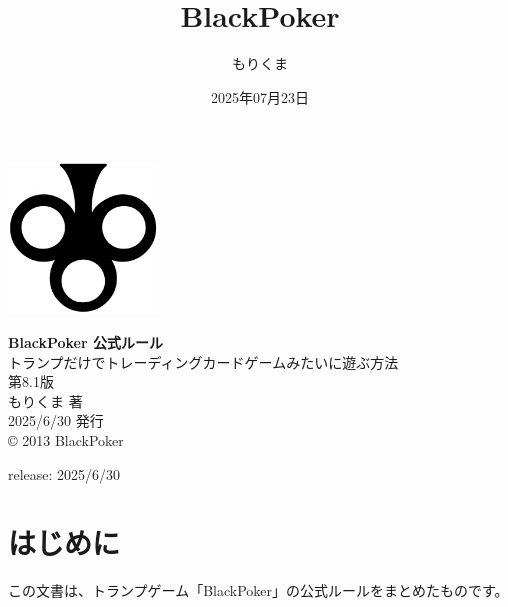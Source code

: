 \documentclass[letterpaper,10pt,dvipdfmx]{sphinxmanual}
\title{BlackPoker}
\date{2025年07月23日}
\author{もりくま}
\begin{document}
\pagestyle{empty}

\begin{titlepage}
\begin{center}
\vspace*{25mm}

\includegraphics[width=4cm]{blackpoker_logo.pdf}  %

\vspace{20mm}
{\Huge \textbf{BlackPoker 公式ルール}}\\[10mm]
{\Large トランプだけでトレーディングカードゲームみたいに遊ぶ方法}\\[30mm]

{\huge 第8.1版}\\[20mm]

{\Large もりくま 著} \\[5mm]
{\Large 2025/6/30 発行}\\[10mm]

{\small © 2013 BlackPoker}

\end{center}
\end{titlepage}

\clearpage
\thispagestyle{empty}  %
\null                  %
\clearpage             %

\pagestyle{plain}
\sphinxtableofcontents
\pagestyle{normal}
\label{\detokenize{index::doc}}


\sphinxAtStartPar
release: 2025/6/30

\sphinxstepscope


\chapter{はじめに}
\label{\detokenize{init/init:init-rst}}\label{\detokenize{init/init:id1}}\label{\detokenize{init/init::doc}}
\sphinxAtStartPar
この文書は、トランプゲーム「BlackPoker」の公式ルールをまとめたものです。
\end{document}
